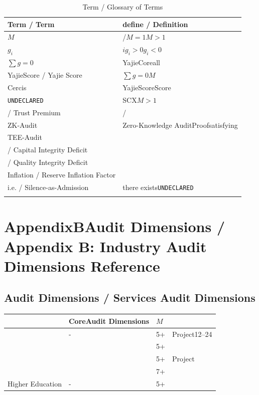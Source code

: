 \documentclass[12pt,a4paper]{article}
\theoremstyle{remark}
\newcommand{\sumgeq}{\sum g = 0}
\newcommand{\undeclared}{\texttt{UNDECLARED}}
\begin{document}
\begin{longtable}{@{}p{3.5cm}p{11cm}@{}}
\toprule
\textbf{Term / Term} & \textbf{define / Definition} \\
\midrule
\endhead
$M$ & /$M=1$$M>1$ \\
\addlinespace
$g_i$ & $i$$g_i > 0$$g_i < 0$ \\
\addlinespace
$\sumgeq$ & YajieCoreall \\
\addlinespace
YajieScore / Yajie Score & $\sumgeq$$M$ \\
\addlinespace
Cercis & YajieScoreScore \\
\addlinespace
\undeclared & SCX$M>1$ \\
\addlinespace
 / Trust Premium & / \\
\addlinespace
ZK-Audit & Zero-Knowledge AuditProofsatisfying \\
\addlinespace
TEE-Audit &  \\
\addlinespace
 / Capital Integrity Deficit &  \\
\addlinespace
 / Quality Integrity Deficit &  \\
\addlinespace
Inflation / Reserve Inflation Factor &  \\
\addlinespace
i.e. / Silence-as-Admission & there exists\undeclared\ \\
\bottomrule
\caption{Term / Glossary of Terms}
\label{tab:glossary}
\end{longtable}

\section{AppendixBAudit Dimensions / Appendix B: Industry Audit Dimensions Reference}

\subsection{Audit Dimensions / Services Audit Dimensions}

\begin{table}[H]
\centering
\begin{tabular}{@{}p{2.5cm}p{5.5cm}p{1.5cm}p{2.5cm}@{}}
\toprule
\textbf{} & \textbf{CoreAudit Dimensions} & \textbf{$M$} & \textbf{} \\
\midrule
 & - & 5+ & Project12--24 \\
 &  & 5+ &  \\
 &  & 5+ & Project \\
 &  & 7+ &  \\
Higher Education & - & 5+ &  \\
\bottomrule
\end{tabular}
\end{table}
\end{document}
